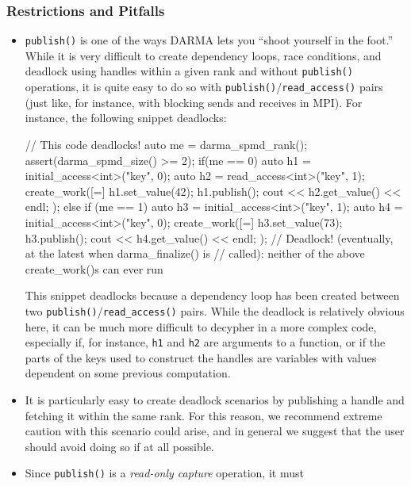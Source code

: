 \begin{subs}
\subsubsection{Restrictions and Pitfalls}
\begin{itemize}
  \item \texttt{publish()} is one of the ways DARMA lets you ``shoot yourself in
  the foot.''  While it is very difficult to create dependency loops, race
  conditions, and deadlock using handles within a given rank and without
  \texttt{publish()} operations, it is quite easy to do so with
  \texttt{publish()}/\texttt{read\_access()} pairs (just like, for instance,
  with blocking sends and receives in MPI).  For instance, the following snippet
  deadlocks:
\begin{minipage}[t]{1\linewidth}%
  \centering
  \begin{CppCode}
// This code deadlocks!
auto me = darma_spmd_rank();
assert(darma_spmd_size() >= 2);
if(me == 0) {
  auto h1 = initial_access<int>("key", 0);
  auto h2 = read_access<int>("key", 1);
  create_work([=]{ 
    h1.set_value(42);
    h1.publish();
    cout << h2.get_value() << endl;
  }); 
}
else if (me == 1) {
  auto h3 = initial_access<int>("key", 1);
  auto h4 = initial_access<int>("key", 0);
  create_work([=]{ 
    h3.set_value(73);
    h3.publish();
    cout << h4.get_value() << endl; 
  }); 
}
// Deadlock! (eventually, at the latest when darma_finalize() is
// called): neither of the above create_work()s can ever run
  \end{CppCode}
\end{minipage}
  This snippet deadlocks because a dependency loop has been created between two
  \texttt{publish()}/\texttt{read\_access()} pairs. While the deadlock is
  relatively obvious here, it can be much more difficult to decypher in a more
  complex code, especially if, for instance, \texttt{h1} and \texttt{h2} are
  arguments to a function, or if the parts of the keys used to construct the
  handles are variables with values dependent on some previous computation.
  \item It is particularly easy to create deadlock scenarios by publishing a
  handle and fetching it within the same rank.  For this reason, we recommend
  extreme caution with this scenario could arise, and in general we suggest that
  the user should avoid doing so if at all possible.
  \item Since \texttt{publish()} is a {\it read-only capture} operation, it must

\end{itemize}
\end{subs}
